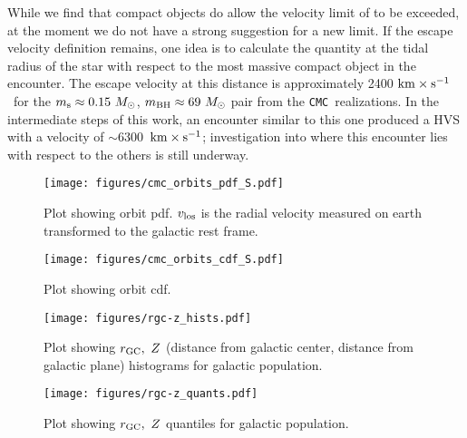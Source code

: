 \documentclass[twocolumn]{aastex631}
\newcommand{\kms}{${\rm km \times s^{-1}}$}
\newcommand{\CMC}{\texttt{CMC}}
\begin{document}
While we find that compact objects do allow the velocity limit of \citet{1991AJ....101..562L} to be exceeded, at the moment we do not have a strong suggestion for a new limit.
If the escape velocity definition remains, one idea is to calculate the quantity at the tidal radius of the star with respect to the most massive compact object in the encounter.
The escape velocity at this distance is approximately 2400 \kms\ for the $m_{\rm s}\approx0.15~M_\odot$, $m_{\rm BH}\approx69~M_\odot$ pair from the \CMC\ realizations.
In the intermediate steps of this work, an encounter similar to this one produced a HVS with a velocity of $\sim$6300~\kms; investigation into where this encounter lies with respect to the others is still underway.


\begin{figure}
    \begin{centering}
        \texttt{[image: figures/cmc\_orbits\_pdf\_S.pdf]}
        \caption{
            Plot showing orbit pdf.
            $v_{\rm los}$ is the radial velocity measured on earth transformed to the galactic rest frame.
        }
        \label{fig:cmc_orbits_pdf}
    \end{centering}
\end{figure}

\begin{figure}
    \begin{centering}
        \texttt{[image: figures/cmc\_orbits\_cdf\_S.pdf]}
        \caption{
            Plot showing orbit cdf.
        }
        \label{fig:cmc_orbits_cdf}
    \end{centering}
\end{figure}

\begin{figure}
    \begin{centering}
        \texttt{[image: figures/rgc-z\_hists.pdf]}
        \caption{
            Plot showing $r_{\rm GC},\ Z$ (distance from galactic center, distance from galactic plane) histograms for galactic population.
        }
        \label{fig:rgc-z_hists}
    \end{centering}
\end{figure}

\begin{figure}
    \begin{centering}
        \texttt{[image: figures/rgc-z\_quants.pdf]}
        \caption{
            Plot showing $r_{\rm GC},\ Z$ quantiles for galactic population.
        }
        \label{fig:rgc-z_quants}
    \end{centering}
\end{figure}
\end{document}
